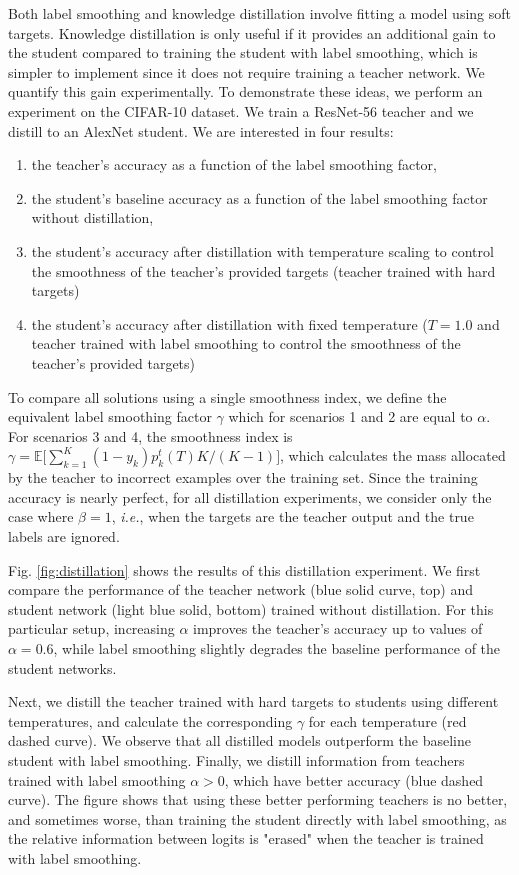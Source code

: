 \documentclass{article}
\begin{document}
Both label smoothing and knowledge distillation involve fitting a model using soft targets. Knowledge distillation is only useful if it provides an additional gain to the student compared to training the student with label smoothing, which is simpler to implement since it does not require training a teacher network. We quantify this gain experimentally.
To demonstrate these ideas, we perform an experiment on the CIFAR-10 dataset. We train a ResNet-56 teacher and we distill to an AlexNet student. We are interested in four results:  
\begin{enumerate}
  \item the teacher's accuracy as a function of the label smoothing factor,
  \item the student's baseline accuracy as a function of the label smoothing factor without distillation,
  \item the student's accuracy after distillation with temperature scaling to control the smoothness of the teacher's provided targets (teacher trained with hard targets)
  \item the student's accuracy after distillation with fixed temperature ($T = 1.0$ and teacher trained with label smoothing to control the smoothness of the teacher's provided targets)
\end{enumerate}
To compare all solutions using a single smoothness index, we define the equivalent label smoothing factor $\gamma$ which for scenarios 1 and 2 are equal to $\alpha$. For scenarios 3 and 4, the smoothness index is $\gamma = \mathbb{E}\big[\sum_{k=1}^{K}(1-y_k)p_k^t(T)K/(K-1)\big]$, which calculates the mass allocated by the teacher to incorrect examples over the training set. Since the training accuracy is nearly perfect, for all distillation experiments, we consider only the case where $\beta=1$, \textit{i.e.}, when the targets are the teacher output and the true labels are ignored.

Fig. \ref{fig:distillation}  shows the results of this distillation experiment. We first compare the performance of the teacher network (blue solid curve, top) and student network (light blue solid, bottom) trained without distillation. For this particular setup, increasing $\alpha$ improves the teacher's accuracy up to values of $\alpha =0.6$, while label smoothing slightly degrades the baseline performance of the student networks.

Next, we distill the teacher trained with hard targets to students using different temperatures, and calculate the corresponding $\gamma$ for each temperature (red dashed curve). We observe that all distilled models outperform the baseline student with label smoothing.
Finally, we distill information from teachers trained with label smoothing $\alpha > 0$, which have better accuracy (blue dashed curve). The figure shows that using these better performing teachers is no better, and sometimes worse, than training the student directly with label smoothing, as the relative information between logits is "erased" when the teacher is trained with label smoothing. 
\end{document}
